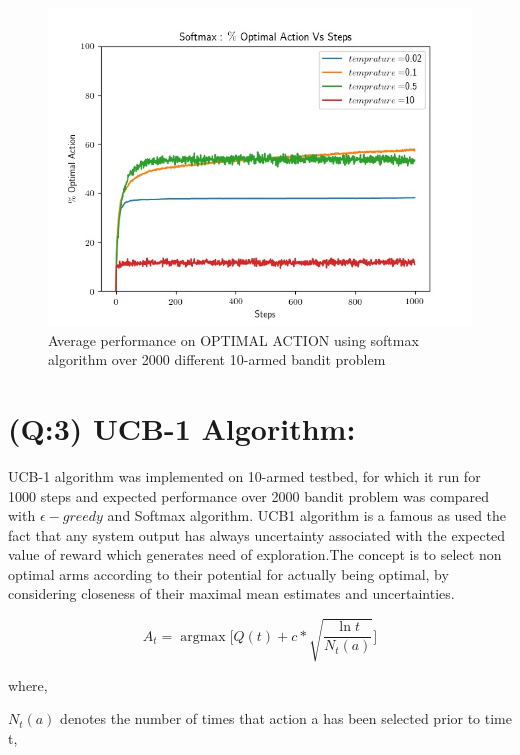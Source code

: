 \documentclass[preprint,12pt]{elsarticle}
\DeclareMathOperator*{\argmax}{argmax}
\begin{document}
 	 
 	 \begin{figure}[H]
 	 	\centering
 	 	\includegraphics[scale=0.7]{./optimal_soft.jpg}
 	 	\hspace{0.25cm}
 	 	\caption{Average performance on OPTIMAL ACTION using softmax algorithm over 2000 different 10-armed bandit problem}
 	 	\label{fig2:soft_opt}
 	 \end{figure}
 	 
 	 
 	 \section{(Q:3)  UCB-1 Algorithm:}
 	 \label{S:3}
 	 
 	 UCB-1 algorithm was implemented on 10-armed testbed, for which it run for 1000 steps and expected performance over 2000 bandit problem was compared with $\epsilon- greedy$ and Softmax algorithm. UCB1 algorithm is a famous as used the fact that any system output has always uncertainty associated with the expected value of reward which generates need of exploration.The concept is to select non optimal
 	 arms according to their potential for actually being optimal, by considering closeness of their maximal mean estimates and uncertainties.
 	 
 	 \begin{equation}
 	 	A_t = \argmax \bigg [Q(t) + c *\sqrt{\frac{\ln{t}}{N_t(a)}} \bigg]
 	 \end{equation}
 	 
 	 where, 
 	 
 	 $N_t(a)$ denotes the number of times that action a has been selected prior to time t, 
 	 
\end{document}
